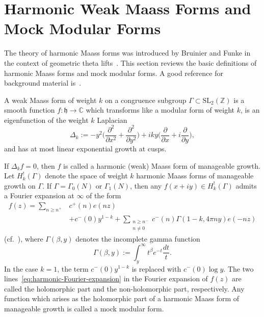 \documentclass[11pt,reqno]{amsart}
\theoremstyle{plain}
\theoremstyle{definition}
\numberwithin{equation}{section}
\begin{document}

\section{Harmonic Weak Maass Forms and Mock Modular Forms} \label{sec:harmonic-Maass-background}

The theory of harmonic Maass forms was introduced by Bruinier and Funke in the context of geometric theta lifts~\cite{BruinierFunke04}. This section reviews the basic definitions of harmonic Maass forms and mock modular forms. A good reference for background material is~\cite[\S{4}]{BFOR19}.

A weak Maass form of weight $k$ on a congruence subgroup $\Gamma \subset \mathrm{SL}_2(\mathbb{Z})$ is a smooth function $f: \mathfrak{h} \to \mathbb{C}$ which transforms like a modular form of weight $k$, is an eigenfunction of the weight $k$ Laplacian
\[
	\Delta_k := - y^2 \Big( \frac{\partial^2}{\partial x^2} + \frac{\partial^2}{\partial y^2}\Big) 
		+ i k y \Big( \frac{\partial}{\partial x} + i \frac{\partial}{\partial y} \Big),
\]
and has at most linear exponential growth at cusps. 

If $\Delta_k f = 0$, then $f$ is called a harmonic (weak) Maass form of manageable growth. Let $H_k^!(\Gamma)$ denote the space of weight $k$ harmonic Maass forms of manageable growth on $\Gamma$. 
If $\Gamma = \Gamma_0(N)$ or $\Gamma_1(N)$, then any $f(x+iy) \in H_k^!(\Gamma)$ admits a Fourier expansion at $\infty$ of the form
\begin{align} \label{eq:harmonic-Fourier-expansion}
f(z) = \sum_{n \geq n^+} &  c^+(n) e(nz) \\[-.5em]
& + c^-(0)y^{1-k} + \sum_{\substack{n \geq n^- \\ n \neq 0 }} c^-(n) \Gamma(1-k,4\pi n y) e(-nz)
\end{align}
(cf.~\cite[Lemma 4.3]{BFOR19}), where $\Gamma(\beta,y)$ denotes the incomplete gamma function
\[\Gamma(\beta,y) := \int_y^\infty t^{\beta} e^{-t} \frac{dt}{t}.\]
In the case $k=1$, the term $c^-(0)y^{1-k}$ is replaced with $c^-(0)\log y$. The two lines~\eqref{eq:harmonic-Fourier-expansion} in the Fourier expansion of $f(z)$ are called the holomorphic part and the non-holomorphic part, respectively. Any function which arises as the holomorphic part of a harmonic Maass form of manageable growth is called a mock modular form.
\end{document}
